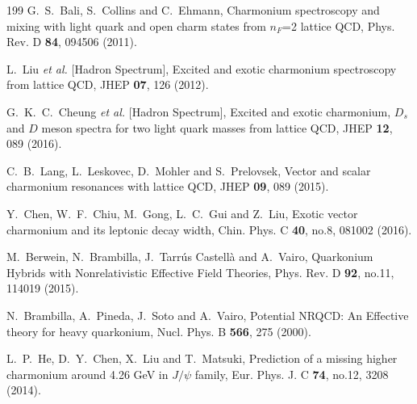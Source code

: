 \documentclass[final,5p,times,twocolumn]{elsarticle}
\begin{document}
\begin{thebibliography}{199}
G.~S.~Bali, S.~Collins and C.~Ehmann,
Charmonium spectroscopy and mixing with light quark and open charm states from $n_F$=2 lattice QCD,
Phys. Rev. D \textbf{84}, 094506 (2011).


L.~Liu \textit{et al.} [Hadron Spectrum],
Excited and exotic charmonium spectroscopy from lattice QCD,
JHEP \textbf{07}, 126 (2012).

G.~K.~C.~Cheung \textit{et al.} [Hadron Spectrum],
Excited and exotic charmonium, $D_s$ and $D$ meson spectra for two light quark masses from lattice QCD,
JHEP \textbf{12}, 089 (2016).

C.~B.~Lang, L.~Leskovec, D.~Mohler and S.~Prelovsek,
Vector and scalar charmonium resonances with lattice QCD,
JHEP \textbf{09}, 089 (2015).

Y.~Chen, W.~F.~Chiu, M.~Gong, L.~C.~Gui and Z.~Liu,
Exotic vector charmonium and its leptonic decay width,
Chin. Phys. C \textbf{40}, no.8, 081002 (2016).

M.~Berwein, N.~Brambilla, J.~Tarr\'us Castell\`a and A.~Vairo,
Quarkonium Hybrids with Nonrelativistic Effective Field Theories,
Phys. Rev. D \textbf{92}, no.11, 114019 (2015).

N.~Brambilla, A.~Pineda, J.~Soto and A.~Vairo,
Potential NRQCD: An Effective theory for heavy quarkonium,
Nucl. Phys. B \textbf{566}, 275 (2000).


L.~P.~He, D.~Y.~Chen, X.~Liu and T.~Matsuki,
Prediction of a missing higher charmonium around 4.26 GeV in $J/\psi$ family,
Eur. Phys. J. C \textbf{74}, no.12, 3208 (2014).



\end{thebibliography}
\end{document}
